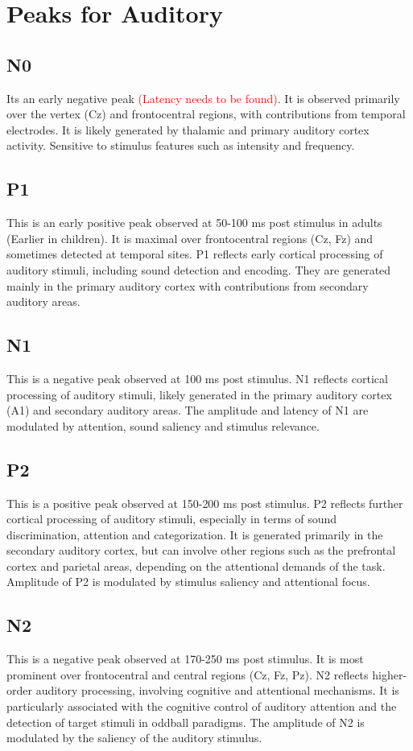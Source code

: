 \documentclass{article}
\begin{document}
	\section{Peaks for Auditory\cite{lightfoot2016summary}}
	\subsection{N0}
	Its an early negative peak \textcolor{red}{(Latency needs to be found)}. It is observed primarily over the vertex (Cz) and frontocentral regions, with contributions from temporal electrodes. It is likely generated by thalamic and primary auditory cortex activity. Sensitive to stimulus features such as intensity and frequency.
	
	\subsection{P1}
	This is an early positive peak observed at 50-100 ms post stimulus in adults (Earlier in children). It is maximal over frontocentral regions (Cz, Fz) and sometimes detected at temporal sites. P1 reflects early cortical processing of auditory stimuli, including sound detection and encoding. They are generated mainly in the primary auditory cortex with contributions from secondary auditory areas.
	
	\subsection{N1}
	This is a negative peak observed at 100 ms post stimulus. N1 reflects cortical processing of auditory stimuli, likely generated in the primary auditory cortex (A1) and secondary auditory areas. The amplitude and latency of N1 are modulated by attention, sound saliency and stimulus relevance.
	
	\subsection{P2}
	This is a positive peak observed at 150-200 ms post stimulus. P2 reflects further cortical processing of auditory stimuli, especially in terms of sound discrimination, attention and categorization. It is generated primarily in the secondary auditory cortex, but can involve other regions such as the prefrontal cortex and parietal areas, depending on the attentional demands of the task. Amplitude of P2 is modulated by stimulus saliency and attentional focus.
	
	\subsection{N2}
	This is a negative peak observed at 170-250 ms post stimulus. It is most prominent over frontocentral and central regions (Cz, Fz, Pz). N2 reflects higher-order auditory processing, involving cognitive and attentional mechanisms. It is particularly associated with the cognitive control of auditory attention and the detection of target stimuli in oddball paradigms. The amplitude of N2 is modulated by the saliency of the auditory stimulus.
	
\end{document}
